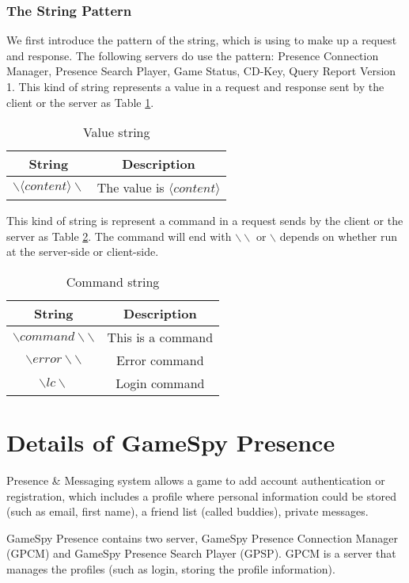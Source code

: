 \documentclass[oneside,titlepage,a4paper]{Definition/retrospy} %
\begin{document}
\subsection{The String Pattern}
We first introduce the pattern of the string, which is using to make up a request and response.
The following servers do use the pattern: Presence Connection Manager, Presence Search Player, Game Status, CD-Key, Query Report Version 1.
This kind of string represents a value in a request and response sent by the client or the server as Table \ref{Value string}.

\begin{table}[H]
	\centering
	\begin{tabular}{|c|c|}
		\hline 
		\textbf{String}&\textbf{Description}  \\ 
		\hline 
		$ \backslash \langle content \rangle \backslash $& The value is $ \langle content \rangle $  \\ 
		\hline 
	\end{tabular} 
	\caption{Value string}
	\label{Value string}
\end{table}

This kind of string is represent a command in a request sends by the client or the server as Table \ref{Command string}.
The command will end with $ \backslash \backslash $ or $ \backslash $ depends on whether run at the server-side or client-side.


\begin{table}[H]
	\centering
	\begin{tabular}{|c|c|}
		\hline 
		\textbf{String}&\textbf{Description}  \\ 
		\hline 
		$ \backslash command \backslash\backslash $& This is a command \\ 		
		\hline 
		$ \backslash error \backslash \backslash $ & Error command \\
		\hline
		$\backslash lc \backslash$& Login command\\
		\hline
	\end{tabular} 
	\caption{Command string}
	\label{Command string}
\end{table}


\chapter{Details of GameSpy Presence}
\par Presence \& Messaging system allows a game to add account authentication or registration, which includes a profile where personal information could be stored (such as email, first name), a friend list (called buddies), private messages.
\par GameSpy Presence contains two server, GameSpy Presence Connection Manager (GPCM) and GameSpy Presence Search Player (GPSP).
GPCM is a server that manages the profiles (such as login, storing the profile information).
\end{document}
